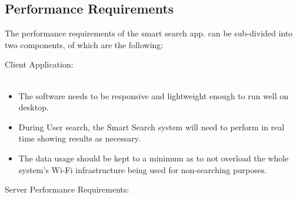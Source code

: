 \documentclass[a4paper,10pt]{article}
\begin{document}
	\subsection{Performance Requirements}
	The performance requirements of the smart search app. can be sub-divided into two components, of which are the following:
	
	\item Client Application:\\\\
		\begin{itemize}
		\item The software needs to be responsive and lightweight enough to run well on desktop.\\
		\item During User search, the Smart Search system will need to perform in real time showing results as necessary.\\
		\item The data usage should be kept to a minimum as to not overload the whole system's Wi-Fi infrastructure being used for non-searching purposes.\\
		\end{itemize}
	\item Server Performance Requirements:\\\\
\end{document}
